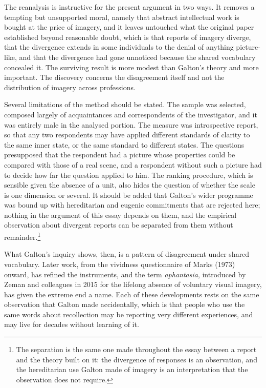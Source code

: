 \documentclass[11pt]{article}
\theoremstyle{remark}
\begin{document}
The reanalysis is instructive for the present argument in two ways. It removes a tempting but unsupported moral, namely that abstract intellectual work is bought at the price of imagery, and it leaves untouched what the original paper established beyond reasonable doubt, which is that reports of imagery diverge, that the divergence extends in some individuals to the denial of anything picture-like, and that the divergence had gone unnoticed because the shared vocabulary concealed it. The surviving result is more modest than Galton's theory and more important. The discovery concerns the disagreement itself and not the distribution of imagery across professions.

Several limitations of the method should be stated. The sample was selected, composed largely of acquaintances and correspondents of the investigator, and it was entirely male in the analysed portion. The measure was introspective report, so that any two respondents may have applied different standards of clarity to the same inner state, or the same standard to different states. The questions presupposed that the respondent had a picture whose properties could be compared with those of a real scene, and a respondent without such a picture had to decide how far the question applied to him. The ranking procedure, which is sensible given the absence of a unit, also hides the question of whether the scale is one dimension or several. It should be added that Galton's wider programme was bound up with hereditarian and eugenic commitments that are rejected here; nothing in the argument of this essay depends on them, and the empirical observation about divergent reports can be separated from them without remainder.\footnote{The separation is the same one made throughout the essay between a report and the theory built on it: the divergence of responses is an observation, and the hereditarian use Galton made of imagery is an interpretation that the observation does not require.}

What Galton's inquiry shows, then, is a pattern of disagreement under shared vocabulary. Later work, from the vividness questionnaire of Marks (1973) onward, has refined the instruments, and the term \emph{aphantasia}, introduced by Zeman and colleagues in 2015 for the lifelong absence of voluntary visual imagery, has given the extreme end a name. Each of these developments rests on the same observation that Galton made accidentally, which is that people who use the same words about recollection may be reporting very different experiences, and may live for decades without learning of it.
\end{document}
